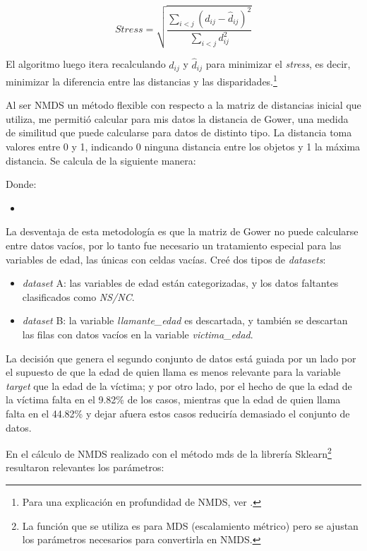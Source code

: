 \documentclass[10 pt]{article}
\begin{document}
\[\textit{Stress} = \sqrt{\frac{\sum_{i<j} \left( d_{ij} - \hat{d}_{ij} \right)^2}{\sum_{i<j} d_{ij}^2}}\]

El algoritmo luego itera recalculando \(d_{ij}\) y \(\hat{d}_{ij}\) para minimizar el \textit{stress}, es decir, minimizar la diferencia entre las distancias y las disparidades.\footnote{Para una explicación en profundidad de NMDS, ver \cite{kruskal1964nonmetric}.} 


Al ser NMDS un método flexible con respecto a la matriz de distancias inicial que utiliza, me permitió calcular para mis datos la distancia de Gower, una medida de similitud que puede calcularse para datos de distinto tipo. La distancia toma valores entre 0 y 1, indicando 0 ninguna distancia entre los objetos y 1 la máxima distancia. Se calcula de la siguiente manera:


Donde:
\begin{itemize}
    \item 
\end{itemize}



La desventaja de esta metodología es que la matriz de Gower no puede calcularse entre datos vacíos, por lo tanto fue necesario un tratamiento especial para las variables de edad, las únicas con celdas vacías. Creé dos tipos de \textit{datasets}: 
\begin{itemize}
    \item \textit{dataset} A: las variables de edad están categorizadas, y los datos faltantes clasificados como \textit{NS/NC}.
    \item  \textit{dataset} B: la variable \textit{llamante\_edad} es descartada, y también se descartan las filas con datos vacíos en la variable \textit{victima\_edad}.
\end{itemize}

La decisión que genera el segundo conjunto de datos está guiada por un lado por el supuesto de que la edad de quien llama es menos relevante para la variable \textit{target} que la edad de la víctima; y por otro lado, por el hecho de que la edad de la víctima falta en el 9.82\% de los casos, mientras que la edad de quien llama falta en el 44.82\% y dejar afuera estos casos reduciría demasiado el conjunto de datos. 

En el cálculo de NMDS realizado con el método mds de la librería Sklearn\footnote{La función que se utiliza es para MDS (escalamiento métrico) pero se ajustan los parámetros necesarios para convertirla en NMDS.} resultaron relevantes los parámetros:
 
\end{document}
